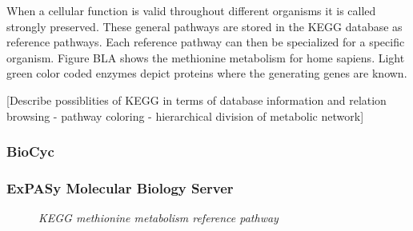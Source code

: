 When a cellular function is valid throughout different organisms it is called strongly preserved. These general pathways are stored in the KEGG database as reference pathways. Each reference pathway can then be specialized for a specific organism. Figure BLA shows the methionine metabolism for home sapiens. Light green color coded enzymes depict proteins where the generating genes are known. 

[Describe possiblities of KEGG in terms of database information and relation browsing - pathway coloring - hierarchical division of metabolic network]

\subsubsection{BioCyc}
\subsubsection{ExPASy Molecular Biology Server}

\begin{figure}[ht]
\centering
{} 
\caption[KEGG methionine metabolism reference pathway]{\textit{KEGG methionine metabolism reference pathway}} 
\label{gfx:KEGG_methionine_metabolism_271_reference_pathway}
\end{figure}

